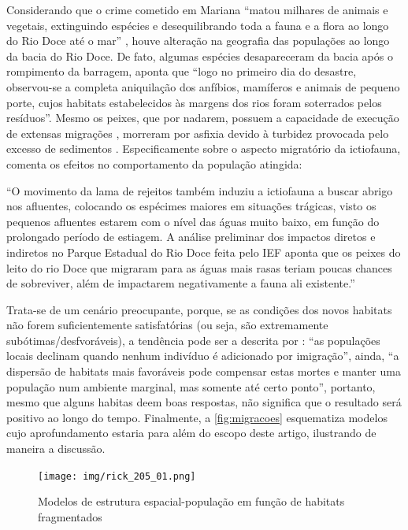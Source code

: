 \documentclass[
article,			%
11pt,				%
oneside,			%
a4paper,			%
english,			%
brazil,				%
sumario=tradicional
]{abntex2}
\begin{document}
	Considerando que o crime cometido em Mariana ``matou milhares de animais e vegetais, extinguindo espécies e desequilibrando toda a fauna e a flora ao longo do Rio Doce até o mar'' \cite[p.282]{passos2017a}, houve alteração na geografia das populações ao longo da bacia do Rio Doce. De fato, algumas espécies desapareceram da bacia após o rompimento da barragem,  aponta que ``logo no primeiro dia do desastre, observou-se a completa aniquilação dos anfíbios, mamíferos e animais de pequeno porte, cujos habitats estabelecidos às margens dos rios foram soterrados pelos resíduos''. Mesmo os peixes, que por nadarem, possuem a capacidade de execução de extensas migrações \cite[p.181]{ricklefs2003a}, morreram por asfixia devido à turbidez provocada pelo excesso de sedimentos \cite[p.11]{lopes2016a}. Especificamente sobre o aspecto migratório da ictiofauna,  comenta os efeitos no comportamento da população atingida:
	
	\begin{citacao}
		``O
		movimento da lama de rejeitos também induziu a ictiofauna a buscar abrigo nos afluentes, colocando
		os espécimes maiores em situações trágicas, visto os pequenos afluentes estarem com o nível das águas
		muito baixo, em função do prolongado período de estiagem. A análise preliminar dos impactos
		diretos e indiretos no Parque Estadual do Rio Doce feita pelo IEF aponta que os peixes do leito do rio
		Doce que migraram para as águas mais rasas teriam poucas chances de sobreviver, além de impactarem
		negativamente a fauna ali existente.''
	\end{citacao}
	
	Trata-se de um cenário preocupante, porque, se as condições dos novos habitats não forem suficientemente satisfatórias (ou seja, são extremamente subótimas/desfvoráveis), a tendência pode ser a descrita por \cite[p.188]{ricklefs2003a}: ``as populações locais declinam quando nenhum indivíduo é adicionado por imigração'', ainda, ``a dispersão de habitats mais favoráveis pode compensar estas mortes e manter uma população num ambiente marginal, mas somente até certo ponto'', portanto, mesmo que alguns habitas deem boas respostas, não significa que o resultado será positivo ao longo do tempo. Finalmente, a \autoref{fig:migracoes} esquematiza modelos cujo aprofundamento estaria para além do escopo deste artigo, ilustrando de maneira a discussão.
	
	\begin{figure}[htb]
		\centering
		\caption{Modelos de estrutura espacial-população em função de habitats fragmentados}
		\texttt{[image: img/rick\_205\_01.png]}
		\label{fig:migracoes}
	\end{figure}
	
\end{document}
